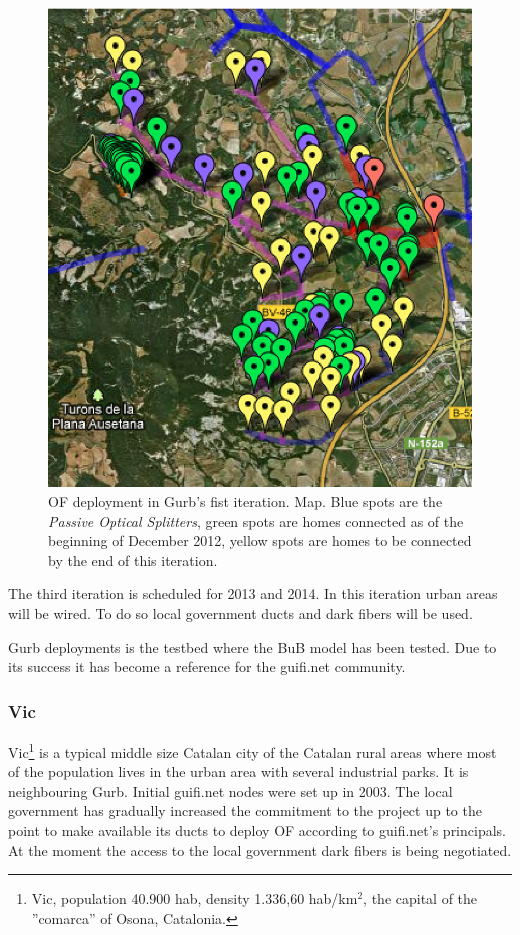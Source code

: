\begin{figure}[htbp]
  \centering
  \includegraphics[scale=1.3]{sect2/figures/Gurb_it2_map.eps} 
  \caption{OF deployment in Gurb's fist iteration. Map. Blue spots are the \emph{Passive Optical Splitters}, green spots are homes connected as of the beginning of December 2012, yellow spots are homes to be connected by the end of this iteration.}
  \label{fig:gurb_it2_map}
\end{figure}

The third iteration is scheduled for 2013 and 2014. In this iteration urban areas will be wired. To do so local government ducts and dark fibers will be used.

Gurb deployments is the testbed where the BuB model has been tested. Due to its success it has become a reference for the guifi.net community.

\FloatBarrier
\subsubsection{Vic}

Vic\footnote{Vic, population 40.900 hab, density 1.336,60 hab/km$^{2}$, the capital of the ''comarca'' of Osona, Catalonia.} is a typical middle size Catalan city of the Catalan rural areas where most of the population lives in the urban area with several industrial parks. It is neighbouring Gurb. Initial guifi.net nodes were set up in 2003. The local government has gradually increased the commitment to the project up to the point to make available its ducts to deploy OF according to guifi.net's principals. At the moment the access to the local government dark fibers is being negotiated.

